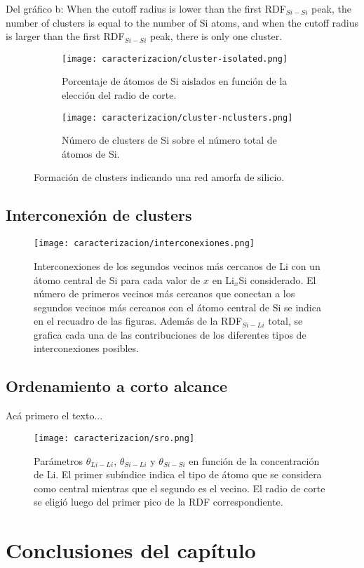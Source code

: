 Del gráfico b: When the cutoff radius is lower than the first RDF$_{Si-Si}$ peak, 
the number of clusters is equal to the number of Si atoms, and when the cutoff 
radius is larger than the first RDF$_{Si-Si}$ peak, there is only one cluster.

\begin{figure}[h]
    \centering
    \begin{subfigure}{.475\textwidth}
        \centering
        \texttt{[image: caracterizacion/cluster-isolated.png]}
        \caption{Porcentaje de átomos de Si aislados en función de la elección del
        radio de corte.}
        \label{fig:clusters-isolated}
    \end{subfigure}
    \hfill
    \begin{subfigure}{.475\textwidth}
        \centering
        \texttt{[image: caracterizacion/cluster-nclusters.png]}
        \caption{Número de clusters de Si sobre el número total de átomos de Si.}
        \label{fig:clusters-nclusters}
    \end{subfigure}
    \caption{Formación de clusters indicando una red amorfa de silicio.}
    \label{fig:clusters}
\end{figure}

\subsection{Interconexión de clusters}\label{s:intercionexion}

\begin{figure}[th]
    \centering
    \texttt{[image: caracterizacion/interconexiones.png]}
    \caption{Interconexiones de los segundos vecinos más cercanos de Li con un 
    átomo central de Si para cada valor de $x$ en Li$_x$Si considerado. El número 
    de primeros vecinos más cercanos que conectan a los segundos vecinos más 
    cercanos con el átomo central de Si se indica en el recuadro de las figuras. 
    Además de la RDF$_{Si-Li}$ total, se grafica cada una de las contribuciones 
    de los diferentes tipos de interconexiones posibles.}
    \label{fig:interconexiones}
\end{figure}

\subsection{Ordenamiento a corto alcance}

Acá primero el texto...
\begin{figure}[th]
    \centering
    \texttt{[image: caracterizacion/sro.png]}
    \caption{Parámetros $\theta_{Li-Li}$, $\theta_{Si-Li}$ y $\theta_{Si-Si}$ 
    en función de la concentración de Li. El primer subíndice indica el tipo de
    átomo que se considera como central mientras que el segundo es el vecino. El
    radio de corte se eligió luego del primer pico de la RDF correspondiente.}
    \label{fig:sro}
\end{figure}


\section{Conclusiones del capítulo}
